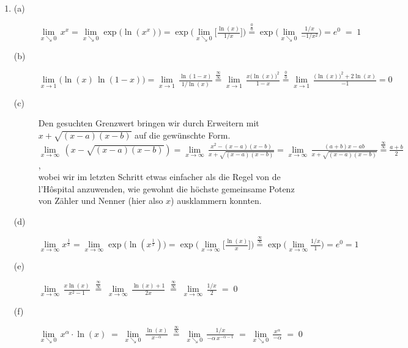 \begin{enumerate}
	\item
	      \begin{description}
		      \item[(a)] $\lim\limits_{x\searrow 0} \, x^x =
			            \lim\limits_{x\searrow 0} \operatorname{exp}\Big( \ln (x^x)\Big) =
			            \operatorname{exp} \Big( \lim\limits_{x\searrow 0} \Big[ \frac{\ln (x)}{1/x}\Big] \Big)
			            \stackrel{\frac{0}{0}}{=}
			            \operatorname{exp} \Big(  \lim\limits_{x\searrow 0} \, \frac{1/x}{-1/x^2}\Big) =
			            e^0 \; = \; 1$
		      \item[(b)] $\lim\limits_{x\rightarrow 1} \Big(  \ln(x) \, \ln (1-x)\Big) =
			            \lim\limits_{x\rightarrow 1} \, \frac{\ln(1-x)}{1/\ln (x)}
			            \stackrel{\frac{\infty}{\infty}}{=}
			            \lim\limits_{x\rightarrow 1} \, \frac{x\big( \ln(x)\big)^2}{1-x}
			            \stackrel{\frac{0}{0}}{=}
			            \lim\limits_{x\rightarrow 1} \, \frac{\big( \ln(x)\big)^2 +2\ln (x)}{-1}  =  0 $
		      \item[(c)] Den gesuchten Grenzwert bringen wir durch Erweitern mit $x+\sqrt{(x-a)(x-b)}$ auf die gewünschte Form. \\
		            $\lim\limits_{x\rightarrow \infty} \, (x-\sqrt{(x-a)(x-b)}) =
			            \lim\limits_{x\rightarrow \infty} \, \frac{x^2-(x-a)(x-b)}{x+\sqrt{(x-a)(x-b)}} =
			            \lim\limits_{x\rightarrow \infty} \, \frac{(a+b)x-ab}{x+\sqrt{(x-a)(x-b)}}
			            \stackrel{\frac{\infty}{\infty}}{=}
			            \frac{a+b}{2}$, \\
		            wobei wir im letzten Schritt etwas einfacher als die Regel von de l'H\^{o}spital anzuwenden, wie gewohnt die höchste gemeinsame Potenz von Zähler und Nenner (hier also $x$) ausklammern konnten.
		      \item[(d)] $\lim\limits_{x\rightarrow \infty}  x^\frac{1}{x}  =
			            \lim\limits_{x\rightarrow \infty} \operatorname{exp}\Big( \ln (x^\frac{1}{x})\Big) \!  = \!
			            \operatorname{exp} \Big( \lim\limits_{x\rightarrow \infty} \Big[ \frac{\ln (x)}{x}\Big] \Big)
			            \! \stackrel{\frac{\infty}{\infty}}{=} \!
			            \operatorname{exp} \Big(  \lim\limits_{x\rightarrow \infty} \frac{1/x}{1}\Big)  \! = \!
			            e^0  \! = \!  1$
		      \item[(e)] $\lim\limits_{x\rightarrow \infty} \, \frac{x\ln (x)}{x^2-1}
			            \; \stackrel{\frac{\infty}{\infty}}{=} \;
			            \lim\limits_{x\rightarrow \infty} \, \frac{\ln (x)+1}{2x}
			            \; \stackrel{\frac{\infty}{\infty}}{=} \;
			            \lim\limits_{x\rightarrow \infty} \, \frac{1/x}{2} \; = \; 0$
		      \item[(f)] $\lim\limits_{x\searrow 0} \, x^\alpha \cdot \ln (x) \; = \;
			            \lim\limits_{x\searrow 0} \, \frac{\ln (x)}{x^{-\alpha}}
			            \; \stackrel{\frac{\infty}{\infty}}{=} \;
			            \lim\limits_{x\searrow 0} \, \frac{1/x}{-\alpha \, x^{-\alpha -1}} \; = \;
			            \lim\limits_{x\searrow 0} \, \frac{x^{\alpha}}{-\alpha} \; = \; 0$
	      \end{description}
	      \smallskip


\end{enumerate}
